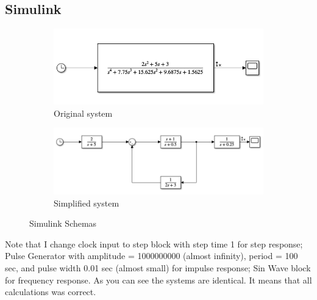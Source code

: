 \documentclass{article}
\begin{document}
\subsection{Simulink}
\begin{figure}[ht]
   	 \centering
     \begin{subfigure}[b]{0.47\textwidth}
         \centering
         \includegraphics[width=\textwidth]{sources/image2_8.png}
         \caption{Original system}
         \label{fig:fig2}
     \end{subfigure}
     \hfill
     \begin{subfigure}[b]{0.47\textwidth}
         \centering
         \includegraphics[width=\textwidth]{sources/image2_9.png}
         \caption{Simplified system}
         \label{fig:fig3}
     \end{subfigure}
     \caption{Simulink Schemas}
\end{figure}
Note that I change clock input to step block with step time 1 for step response; Pulse Generator with amplitude = 1000000000 (almost infinity), period = 100 sec, and pulse width 0.01 sec (almost small) for impulse response; Sin Wave block for frequency response. As you can see the systems are identical. It means that all calculations was correct.
\end{document}
